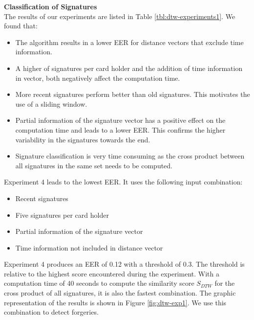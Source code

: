 \documentclass[a4paper, oneside]{csthesis}
\begin{document}
\textbf{Classification of Signatures}\\
The results of our experiments are listed in Table \ref{tbl:dtw-experiments1}.
We found that:
\begin{itemize}
\item The algorithm results in a lower EER for distance vectors that exclude time information.
\item A higher of signatures per card holder and the addition of time information in vector, both negatively affect the computation time.
\item More recent signatures perform better than old signatures. This motivates the use of a sliding window.
\item Partial information of the signature vector has a positive effect on the computation time and leads to a lower EER. This confirms the higher variability in the signatures towards the end.
\item Signature classification is very time consuming as the cross product between all signatures in the same set needs to be computed.
\end{itemize}

Experiment 4 leads to the lowest EER. It uses the following input combination:
\begin{itemize}
\item Recent signatures
\item Five signatures per card holder
\item Partial information of the signature vector
\item Time information not included in distance vector
\end{itemize}

Experiment 4 produces an EER of 0.12 with a threshold of 0.3. The threshold is relative to the highest score encountered during the experiment. With a computation time of 40 seconds to compute the similarity score $S_{DTW}$ for the cross product of all signatures, it is also the fastest combination. The graphic representation of the results is shown in Figure \ref{fig:dtw-exp1}. We use this combination to detect forgeries.
\end{document}
